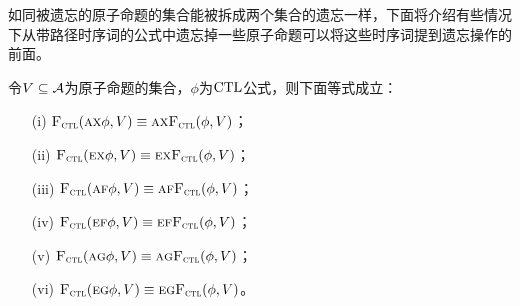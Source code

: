 如同被遗忘的原子命题的集合能被拆成两个集合的遗忘一样，下面将介绍有些情况下从带路径时序词的公式中遗忘掉一些原子命题可以将这些时序词提到遗忘操作的前面。
\begin{proposition}
	令$V\subseteq {\cal A}$为原子命题的集合，$\phi$为$\textrm{CTL}$公式，则下面等式成立：
	\begin{itemize}
		\item[(i)] ${\textsc{F}_{\textsc{ctl}}}(\textsc{a}\textsc{x}\phi,V) \equiv \textsc{a} \textsc{x}{\textsc{F}_{\textsc{ctl}}}(\phi,V)$；
		\item[(ii)] ${\textsc{F}_{\textsc{ctl}}}(\textsc{e}\textsc{x}\phi,V) \equiv \textsc{e} \textsc{x}{\textsc{F}_{\textsc{ctl}}}(\phi,V)$；
		\item[(iii)] ${\textsc{F}_{\textsc{ctl}}}(\textsc{a}\textsc{f}\phi,V) \equiv \textsc{a}\textsc{f}{\textsc{F}_{\textsc{ctl}}}(\phi,V)$；
		\item[(iv)] ${\textsc{F}_{\textsc{ctl}}}(\textsc{e}\textsc{f}\phi,V) \equiv \textsc{e}\textsc{f}{\textsc{F}_{\textsc{ctl}}}(\phi,V)$；
		\item[(v)] ${\textsc{F}_{\textsc{ctl}}}(\textsc{a} \textsc{g}\phi,V)\equiv \textsc{a} \textsc{g}{\textsc{F}_{\textsc{ctl}}}(\phi,V)$；
		\item[(vi)] ${\textsc{F}_{\textsc{ctl}}}(\textsc{e}\textsc{g}\phi,V)\equiv\textsc{e}\textsc{g} {\textsc{F}_{\textsc{ctl}}}(\phi,V)$。
	\end{itemize}
\end{proposition}
